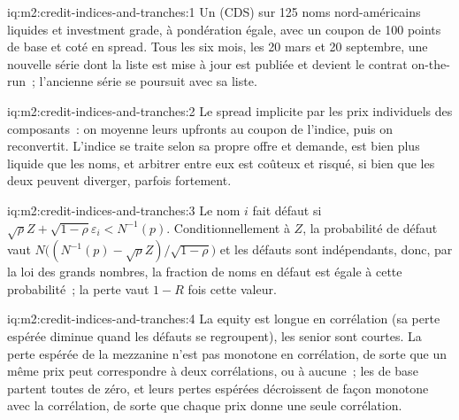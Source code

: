 \begin{solution}{iq:m2:credit-indices-and-tranches:1}
Un  (CDS) sur 125 noms nord-américains liquides et investment grade, à
pondération égale, avec un coupon de 100 points de base et coté en spread. Tous les six mois, les
20 mars et 20 septembre, une nouvelle série dont la liste est mise à jour est publiée et devient le
contrat on-the-run~; l'ancienne série se poursuit avec sa liste.
\end{solution}

\begin{solution}{iq:m2:credit-indices-and-tranches:2}
Le spread implicite par les prix individuels des composants~: on moyenne leurs upfronts au
coupon de l'indice, puis on reconvertit. L'indice se traite selon sa propre offre et demande, est
bien plus liquide que les noms, et arbitrer entre eux est coûteux et risqué, si bien que les
deux peuvent diverger, parfois fortement.
\end{solution}

\begin{solution}{iq:m2:credit-indices-and-tranches:3}
Le nom $i$ fait défaut si $\sqrt\rho Z + \sqrt{1-\rho}\varepsilon_i < N^{-1}(p)$. Conditionnellement à $Z$, la
probabilité de défaut vaut $N\bigl((N^{-1}(p) - \sqrt\rho Z)/\sqrt{1-\rho}\bigr)$ et les
défauts sont indépendants, donc, par la loi des grands nombres, la fraction de noms en défaut
est égale à cette probabilité~; la perte vaut $1-R$ fois cette valeur.
\end{solution}

\begin{solution}{iq:m2:credit-indices-and-tranches:4}
La  equity est longue en corrélation (sa perte espérée diminue quand les défauts se regroupent), les
 senior sont courtes. La perte espérée de la mezzanine n'est pas monotone en corrélation, de sorte que
un même prix peut correspondre à deux corrélations, ou à aucune~; les  de base partent toutes de zéro, et leurs
pertes espérées décroissent de façon monotone avec la corrélation, de sorte que chaque prix
donne une seule corrélation.
\end{solution}

